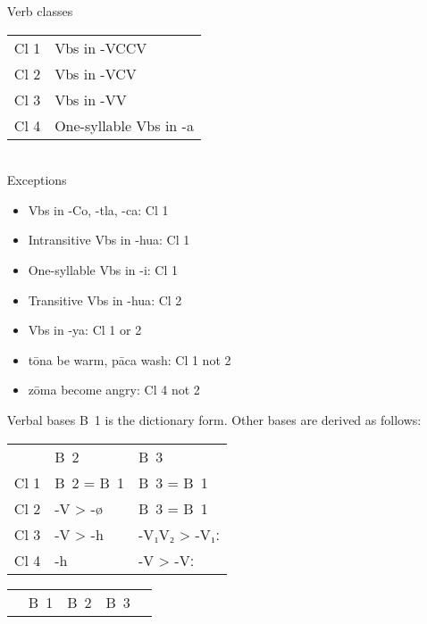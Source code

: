 \documentclass[12pt]{beamer}
\newcommand{\nah}[1]{\textcolor{nahgrn}{#1}}
\newcommand{\trs}[1]{\textcolor{nahblu}{#1}}
\begin{document}
\begin{frame}
\begin{columns}[t]
\begin{column}{0.18\linewidth}
    \end{column}
    \begin{column}{.18\linewidth}
      \begin{block}{Verb classes}
        \begin{tabular}{ll}
          Cl 1 & Vbs in \nah{-VCCV}           \\
          Cl 2 & Vbs in \nah{-VCV}            \\
          Cl 3 & Vbs in \nah{-VV}             \\
          Cl 4 & One-syllable Vbs in \nah{-a}
        \end{tabular}\\
        Exceptions
        \begin{itemize}
          \item Vbs in \nah{-Co}, \nah{-tla}, \nah{-ca}: Cl 1
          \item Intransitive Vbs in \nah{-hua}: Cl 1
          \item One-syllable Vbs in \nah{-i}: Cl 1
          \item Transitive Vbs in \nah{-hua}: Cl 2
          \item Vbs in \nah{-ya}: Cl 1 or 2
          \item \nah{tōna} \trs{be warm}, \nah{pāca} \trs{wash}: Cl 1 not 2
          \item \nah{zōma} \trs{become angry}: Cl 4 not 2
        \end{itemize}
      \end{block}
      \begin{block}{Verbal bases}
        B~1 is the dictionary form. Other bases are derived as follows:
        \begin{tabular}{lll}
               & B~2           & B~3                \\
          Cl 1 & B~2 = B~1     & B~3 = B~1          \\
          Cl 2 & \nah{-V > -ø} & B~3 = B~1          \\
          Cl 3 & \nah{-V > -h} & \nah{-V₁V₂ > -V₁ː} \\
          Cl 4 & \nah{-h}      & \nah{-V > -Vː}
        \end{tabular}
      \end{block}
      \begin{example}
        \begin{tabular}{lllll}
               & B~1          & B~2          & B~3          &             \\

\end{tabular}
\end{example}
\end{column}
\end{columns}
\end{frame}
\end{document}
